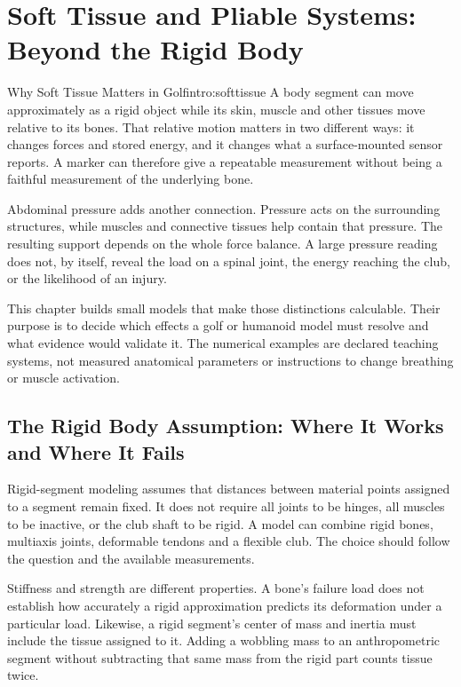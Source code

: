 \chapter[Soft Tissue and Pliable Systems: Beyond the Rigid Body]{Soft Tissue and Pliable Systems:\\Beyond the Rigid Body}
\label{ch:soft_tissue_pliable}

\begin{laymansbox}{Why Soft Tissue Matters in Golf}{intro:softtissue}
A body segment can move approximately as a rigid object while its skin, muscle and other tissues move relative to its bones. That relative motion matters in two different ways: it changes forces and stored energy, and it changes what a surface-mounted sensor reports. A marker can therefore give a repeatable measurement without being a faithful measurement of the underlying bone.

Abdominal pressure adds another connection. Pressure acts on the surrounding structures, while muscles and connective tissues help contain that pressure. The resulting support depends on the whole force balance. A large pressure reading does not, by itself, reveal the load on a spinal joint, the energy reaching the club, or the likelihood of an injury.

This chapter builds small models that make those distinctions calculable. Their purpose is to decide which effects a golf or humanoid model must resolve and what evidence would validate it. The numerical examples are declared teaching systems, not measured anatomical parameters or instructions to change breathing or muscle activation.
\end{laymansbox}

\section{The Rigid Body Assumption: Where It Works and Where It Fails}
\label{sec:rigid_assumption}
\label{constr:constraint:rigid_fails}

Rigid-segment modeling assumes that distances between material points assigned to a segment remain fixed. It does not require all joints to be hinges, all muscles to be inactive, or the club shaft to be rigid. A model can combine rigid bones, multiaxis joints, deformable tendons and a flexible club. The choice should follow the question and the available measurements.

Stiffness and strength are different properties. A bone's failure load does not establish how accurately a rigid approximation predicts its deformation under a particular load. Likewise, a rigid segment's center of mass and inertia must include the tissue assigned to it. Adding a wobbling mass to an anthropometric segment without subtracting that same mass from the rigid part counts tissue twice.


